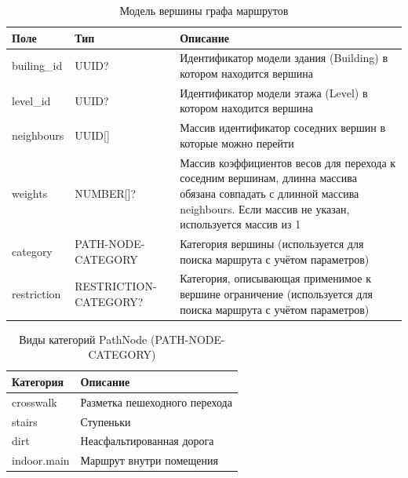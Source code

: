           \begin{center}
            \begin{xltabular}{\linewidth}{|l|p{4cm}|X|}
              \caption{Модель вершины графа маршрутов}\\\hline
              Поле        & Тип                   & Описание                                                                                                                                                                    \\ \hline
              builing\_id & UUID?                 & Идентификатор модели здания (Building) в котором находится вершина                                                                                                          \\ \hline
              level\_id   & UUID?                 & Идентификатор модели этажа (Level) в котором находится вершина                                                                                                              \\ \hline
              neighbours  & UUID[]                & Массив идентификатор соседних вершин в которые можно перейти                                                                                                                \\ \hline
              weights     & NUMBER[]?             & Массив коэффициентов весов для перехода к соседним вершинам, длинна массива обязана совпадать с длинной массива neighbours. Если массив не указан, используется массив из 1 \\ \hline
              category    & PATH-NODE-CATEGORY    & Категория вершины (используется для поиска маршрута с учётом параметров)                                                                                                    \\ \hline
              restriction & RESTRICTION-CATEGORY? & Категория, описывающая применимое к вершине ограничение (используется для поиска маршрута с учётом параметров)                                                               \\ \hline
            \end{xltabular}
          \end{center}

          \begin{center}
            \begin{xltabular}{\linewidth}{|l|X|}
              \caption{Виды категорий PathNode (PATH-NODE-CATEGORY)}\\             \hline
              Категория   & Описание                      \\ \hline
              crosswalk   & Разметка пешеходного перехода \\ \hline
              stairs      & Ступеньки                     \\ \hline
              dirt        & Неасфальтированная дорога     \\ \hline
              indoor.main & Маршрут внутри помещения      \\ \hline
            \end{xltabular}
          \end{center}



